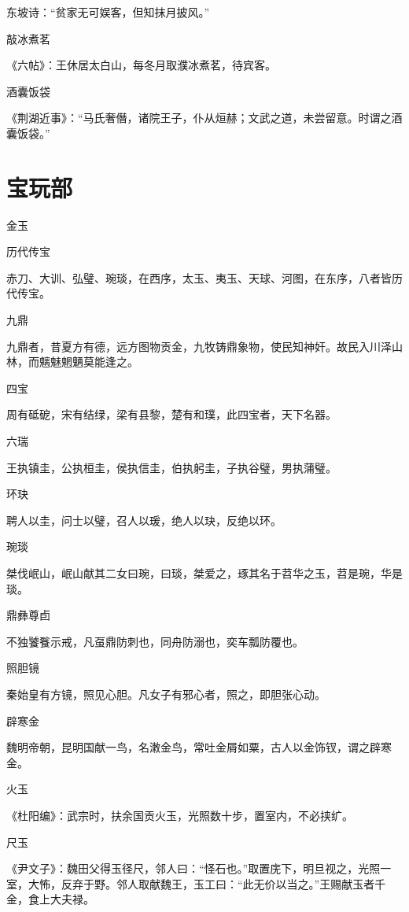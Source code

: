 \documentclass[a4paper,12pt,UTF8,twoside]{ctexbook}
\begin{document}
    东坡诗：“贫家无可娱客，但知抹月披风。”
    
    敲冰煮茗
    
    《六帖》：王休居太白山，每冬月取濮冰煮茗，待宾客。
    
    酒囊饭袋
    
    《荆湖近事》：“马氏奢僭，诸院王子，仆从烜赫；文武之道，未尝留意。时谓之酒囊饭袋。”
    
    \part{宝玩部}
    
    金玉
    
    历代传宝
    
    赤刀、大训、弘璧、琬琰，在西序，太玉、夷玉、天球、河图，在东序，八者皆历代传宝。
    
    九鼎
    
    九鼎者，昔夏方有德，远方图物贡金，九牧铸鼎象物，使民知神奸。故民入川泽山林，而魑魅魍魉莫能逢之。
    
    四宝
    
    周有砥砨，宋有结绿，梁有县黎，楚有和璞，此四宝者，天下名器。
    
    六瑞
    
    王执镇圭，公执桓圭，侯执信圭，伯执躬圭，子执谷璧，男执蒲璧。
    
    环玦
    
    聘人以圭，问士以璧，召人以瑗，绝人以玦，反绝以环。
    
    琬琰
    
    桀伐岷山，岷山献其二女曰琬，曰琰，桀爱之，琢其名于苕华之玉，苕是琬，华是琰。
    
    鼎彝尊卣
    
    不独饕餮示戒，凡虿鼎防刺也，同舟防溺也，奕车瓢防覆也。
    
    照胆镜
    
    秦始皇有方镜，照见心胆。凡女子有邪心者，照之，即胆张心动。
    
    辟寒金
    
    魏明帝朝，昆明国献一鸟，名潄金鸟，常吐金屑如粟，古人以金饰钗，谓之辟寒金。
    
    火玉
    
    《杜阳编》：武宗时，扶余国贡火玉，光照数十步，置室内，不必挟纩。
    
    尺玉
    
    《尹文子》：魏田父得玉径尺，邻人曰：“怪石也。”取置庑下，明旦视之，光照一室，大怖，反弃于野。邻人取献魏王，玉工曰：“此无价以当之。”王赐献玉者千金，食上大夫禄。
    
\end{document}
